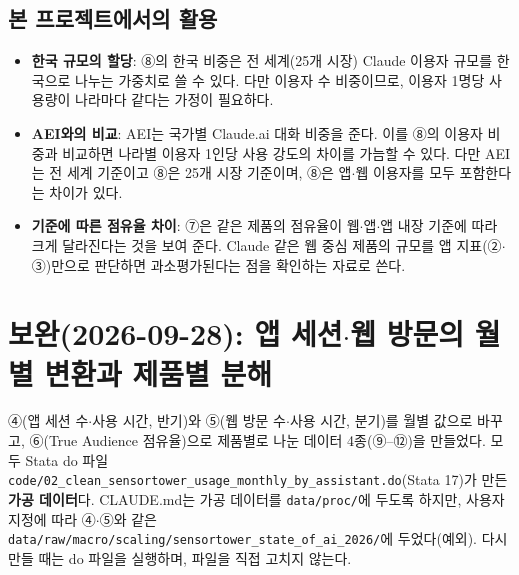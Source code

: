 \documentclass[11pt]{article}
\begin{document}
\subsection{본 프로젝트에서의 활용}

\begin{itemize}
  \item \textbf{한국 규모의 할당}: ⑧의 한국 비중은 전 세계(25개 시장) Claude 이용자 규모를 한국으로 나누는 가중치로 쓸 수 있다. 다만 이용자 수 비중이므로, 이용자 1명당 사용량이 나라마다 같다는 가정이 필요하다.
  \item \textbf{AEI와의 비교}: AEI는 국가별 Claude.ai 대화 비중을 준다. 이를 ⑧의 이용자 비중과 비교하면 나라별 이용자 1인당 사용 강도의 차이를 가늠할 수 있다. 다만 AEI는 전 세계 기준이고 ⑧은 25개 시장 기준이며, ⑧은 앱$\cdot$웹 이용자를 모두 포함한다는 차이가 있다.
  \item \textbf{기준에 따른 점유율 차이}: ⑦은 같은 제품의 점유율이 웹$\cdot$앱$\cdot$앱 내장 기준에 따라 크게 달라진다는 것을 보여 준다. Claude 같은 웹 중심 제품의 규모를 앱 지표(②$\cdot$③)만으로 판단하면 과소평가된다는 점을 확인하는 자료로 쓴다.
\end{itemize}

\section{보완(2026-09-28): 앱 세션$\cdot$웹 방문의 월별 변환과 제품별 분해}

④(앱 세션 수$\cdot$사용 시간, 반기)와 ⑤(웹 방문 수$\cdot$사용 시간, 분기)를 월별 값으로 바꾸고, ⑥(True Audience 점유율)으로 제품별로 나눈 데이터 4종(⑨--⑫)을 만들었다. 모두 Stata do 파일 \texttt{code/02\_clean\_sensortower\_usage\_monthly\_by\_assistant.do}(Stata 17)가 만든 \textbf{가공 데이터}다. CLAUDE.md는 가공 데이터를 \texttt{data/proc/}에 두도록 하지만, 사용자 지정에 따라 ④$\cdot$⑤와 같은 \texttt{data/raw/macro/scaling/sensortower\_state\_of\_ai\_2026/}에 두었다(예외). 다시 만들 때는 do 파일을 실행하며, 파일을 직접 고치지 않는다.
\end{document}
